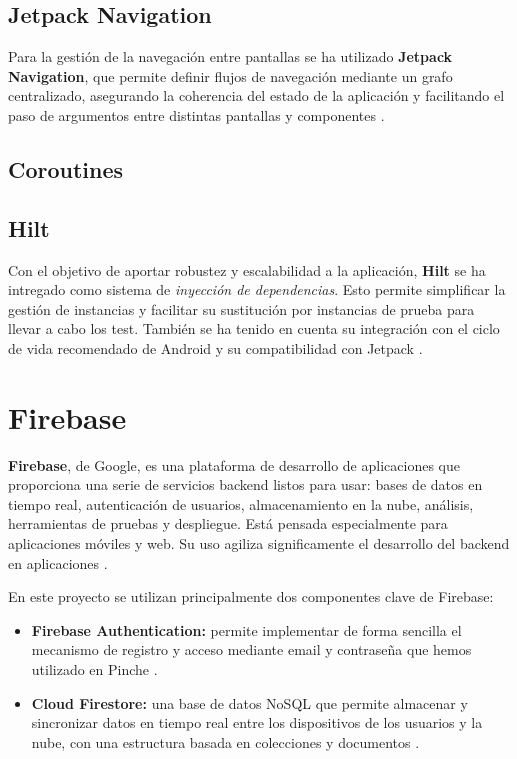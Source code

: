\subsection{Jetpack Navigation}

Para la gestión de la navegación entre pantallas se ha utilizado \textbf{Jetpack Navigation}, que permite definir flujos de navegación mediante un grafo centralizado, asegurando la coherencia del estado de la aplicación y facilitando el paso de argumentos entre distintas pantallas y componentes \cite{jetpack-navigation}.

\subsection{Coroutines}

\subsection{Hilt}

Con el objetivo de aportar robustez y escalabilidad a la aplicación, \textbf{Hilt} se ha intregado como sistema de \textit{inyección de dependencias}. Esto permite simplificar la gestión de instancias y facilitar su sustitución por instancias de prueba para llevar a cabo los test. También se ha tenido en cuenta su integración con el ciclo de vida recomendado de Android y su compatibilidad con Jetpack \cite{hilt}.

\section{Firebase}

\textbf{Firebase}, de Google, es una plataforma de desarrollo de aplicaciones que proporciona una serie de servicios backend listos para usar: bases de datos en tiempo real, autenticación de usuarios, almacenamiento en la nube, análisis, herramientas de pruebas y despliegue. Está pensada especialmente para aplicaciones móviles y web. Su uso agiliza significamente el desarrollo del backend en aplicaciones \cite{firebase}.

En este proyecto se utilizan principalmente dos componentes clave de Firebase:

\begin{itemize}
    \item \textbf{Firebase Authentication:} permite implementar de forma sencilla el mecanismo de registro y acceso mediante email y contraseña que hemos utilizado en Pinche \cite{firebase-auth}.

    \item \textbf{Cloud Firestore:} una base de datos NoSQL que permite almacenar y sincronizar datos en tiempo real entre los dispositivos de los usuarios y la nube, con una estructura basada en colecciones y documentos \cite{firestore}.
\end{itemize}


